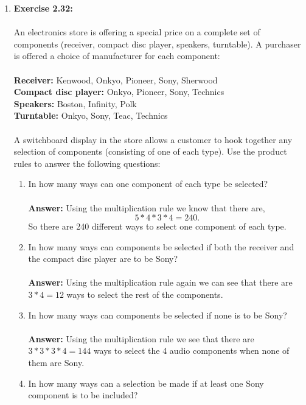 \documentclass[12pt]{article}
\theoremstyle{homework}
\begin{document}
\begin{enumerate}
\vspace{1in}


\item\hspace{.5in}\textbf{Exercise 2.32:}\\
\\
An electronics store is offering a special price on a complete set of components (receiver, compact disc player, speakers, turntable). A purchaser is offered a choice of manufacturer for each component:\\
\\
\textbf{Receiver:} Kenwood, Onkyo, Pioneer, Sony, Sherwood \\
\textbf{Compact disc player:} Onkyo, Pioneer, Sony, Technics\\
\textbf{Speakers:} Boston, Infinity, Polk\\
\textbf{Turntable:} Onkyo, Sony, Teac, Technics\\
\\
A switchboard display in the store allows a customer to hook together any selection of components (consisting of one of each type). Use the product rules to answer the following questions:
\begin{enumerate}
\item In how many ways can one component of each type be selected?\\
\\
 \textbf{Answer:} Using the multiplication rule we know that there are, 
 \begin{equation*}
   5*4*3*4 = 240.
 \end{equation*}
 So there are 240 different ways to select one component of each type.
 \\
\item In how many ways can components be selected if both the receiver and the compact disc player are to be Sony?\\
\\
 \textbf{Answer:} Using the multiplication rule again we can see that there are $3*4 = 12$ ways to select the rest of the components.
 \\
\item In how many ways can components be selected if none is to be Sony?\\
\\
 \textbf{Answer:} Using the multiplication rule we see that there are $3*3*3*4 = 144$ ways to select the 4 audio components when none of them are Sony.
 \\
\item In how many ways can a selection be made if at least one Sony component is to be included?\\

\end{enumerate}
\end{enumerate}
\end{document}
